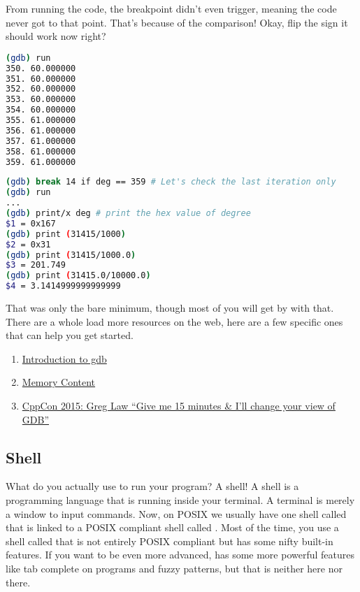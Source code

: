 From running the code, the breakpoint didn't even trigger, meaning the code never got to that point.
That’s because of the comparison!
Okay, flip the sign it should work now right?

\begin{lstlisting}[language=bash]
(gdb) run
350. 60.000000
351. 60.000000
352. 60.000000
353. 60.000000
354. 60.000000
355. 61.000000
356. 61.000000
357. 61.000000
358. 61.000000
359. 61.000000

\end{lstlisting}

\begin{lstlisting}[language=bash]
(gdb) break 14 if deg == 359 # Let's check the last iteration only
(gdb) run
...
(gdb) print/x deg # print the hex value of degree
$1 = 0x167
(gdb) print (31415/1000)
$2 = 0x31
(gdb) print (31415/1000.0)
$3 = 201.749
(gdb) print (31415.0/10000.0)
$4 = 3.1414999999999999

\end{lstlisting}

That was only the bare minimum, though most of you will get by with that.
There are a whole load more resources on the web, here are a few specific ones that can help you get started.

\begin{enumerate}
\item \href{http://www.cs.cmu.edu/~gilpin/tutorial/}{Introduction to gdb}
\item \href{http://www.delorie.com/gnu/docs/gdb/gdb\_56.html}{Memory Content}
\item \href{https://www.youtube.com/watch?v=PorfLSr3DDI}{CppCon 2015: Greg Law “Give me 15 minutes & I'll change your view of GDB”}
\end{enumerate}

\subsection{Shell}

What do you actually use to run your program? A shell! A shell is a programming language that is running inside your terminal. A terminal is merely a window to input commands. Now, on POSIX we usually have one shell called  that is linked to a POSIX compliant shell called . Most of the time, you use a shell called  that is not entirely POSIX compliant but has some nifty built-in features. If you want to be even more advanced,  has some more powerful features like tab complete on programs and fuzzy patterns, but that is neither here nor there.

